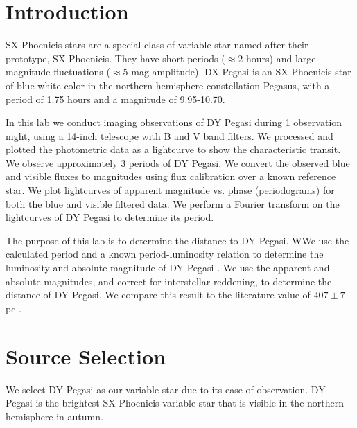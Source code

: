 \documentclass[twocolumn]{aastex631}
\begin{document}


\section{Introduction} \label{sec:intro}

SX Phoenicis stars are a special class of variable star named after their prototype, SX Phoenicis. They have short periods ($\approx 2$ hours) and large magnitude fluctuations ($\approx 5$ mag amplitude). DX Pegasi is an SX Phoenicis star of blue-white color in the northern-hemisphere constellation Pegasus, with a period of 1.75 hours and a magnitude of 9.95-10.70.

In this lab we conduct imaging observations of DY Pegasi during 1 observation night, using a 14-inch telescope with B and V band filters. We processed and plotted the photometric data as a lightcurve to show the characteristic transit. We observe approximately 3 periods of DY Pegasi. We convert the observed blue and visible fluxes to magnitudes using flux calibration over a known reference star. We plot lightcurves of apparent magnitude vs. phase (periodograms) for both the blue and visible filtered data. We perform a Fourier transform on the lightcurves of DY Pegasi to determine its period. 

The purpose of this lab is to determine the distance to DY Pegasi. WWe use the calculated period and a known period-luminosity relation to determine the luminosity and absolute magnitude of DY Pegasi \citep{Cohen_Sarajedini_2012}. We use the apparent and absolute magnitudes, and correct for interstellar reddening, to determine the distance of DY Pegasi. We compare this result to the literature value of $407 \pm 7$ pc \citep{Hintz_2004}.

\section{Source Selection} \label{sec:source}

We select DY Pegasi as our variable star due to its ease of observation. DY Pegasi is the brightest SX Phoenicis variable star that is visible in the northern hemisphere in autumn.
\end{document}
